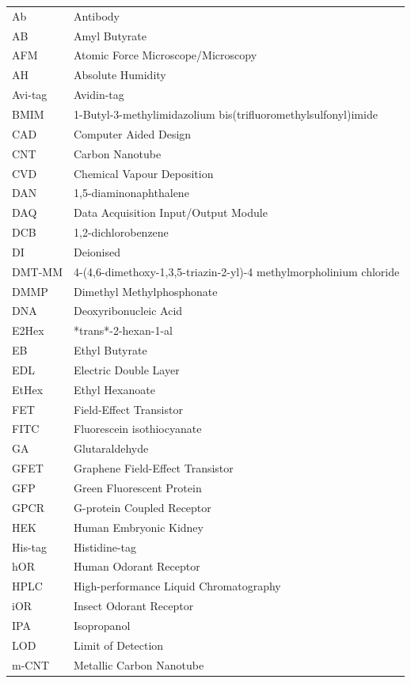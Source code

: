 \documentclass[
  a4paper,
]{scrbook}
\begin{document}
\begin{table}[h]
  \begin{tabular}{@{}p{} p{}@{}}  %
    Ab  & Antibody  \\
    AB  & Amyl Butyrate  \\
    AFM  & Atomic Force Microscope/Microscopy  \\
    AH  & Absolute Humidity  \\
    Avi-tag  & Avidin-tag  \\
    BMIM  & 1-Butyl-3-methylimidazolium bis(trifluoromethylsulfonyl)imide  \\
    CAD  & Computer Aided Design \\
    CNT  & Carbon Nanotube  \\
    CVD  & Chemical Vapour Deposition  \\
    DAN  & 1,5-diaminonaphthalene  \\
    DAQ  & Data Acquisition Input/Output Module  \\
    DCB  & 1,2-dichlorobenzene  \\
    DI  & Deionised  \\
    DMT-MM   & 4-(4,6-dimethoxy-1,3,5-triazin-2-yl)-4 methylmorpholinium chloride \\
    DMMP  & Dimethyl Methylphosphonate  \\
    DNA  & Deoxyribonucleic Acid  \\
    E2Hex  & *trans*-2-hexan-1-al  \\ 
    EB  & Ethyl Butyrate  \\
    EDL  & Electric Double Layer  \\
    EtHex  & Ethyl Hexanoate  \\
    FET  & Field-Effect Transistor  \\
    FITC  & Fluorescein isothiocyanate  \\
    GA  & Glutaraldehyde  \\
    GFET  & Graphene Field-Effect Transistor  \\
    GFP  & Green Fluorescent Protein  \\
    GPCR  & G-protein Coupled Receptor  \\
    HEK  & Human Embryonic Kidney  \\
    His-tag  & Histidine-tag  \\
    hOR  & Human Odorant Receptor  \\
    HPLC  & High-performance Liquid Chromatography   \\
    iOR  & Insect Odorant Receptor  \\
    IPA  & Isopropanol  \\
    LOD  & Limit of Detection  \\
    m-CNT  & Metallic Carbon Nanotube   \\
  \end{tabular}
\end{table}
\end{document}
